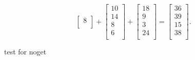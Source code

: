 \begin{eks}
\begin{center}
$$\begin{bmatrix}
8\\
\end{bmatrix}
+
\begin{bmatrix}
10\\
14\\
8\\
6\\
\end{bmatrix}
+
\begin{bmatrix}
18\\
9\\
3\\
24\\
\end{bmatrix}
=
\begin{bmatrix}
36\\
39\\
15\\
38\\
\end{bmatrix}.
$$
\end{center}
\end{eks}
\begin{eks}
test for noget
\end{eks}